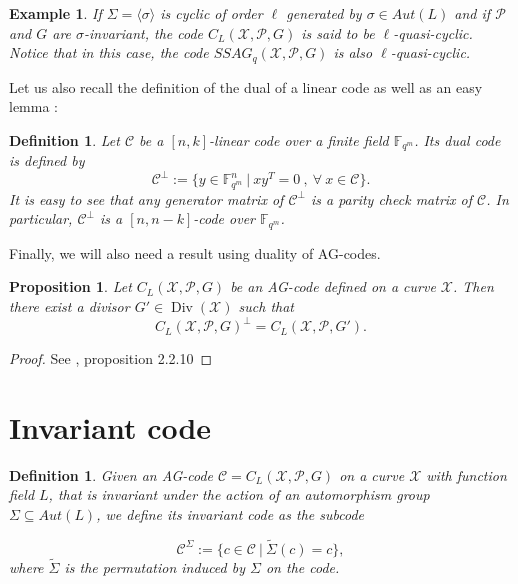 \documentclass[10pt]{article}
\newtheorem{def1}[thm]{Definition}
\newtheorem{expl}[thm]{Example}
\newtheorem{prop1}[thm]{Proposition}
\newcommand{\s}{\vspace{0.3cm}}
\newcommand{\fqm}{\mathbb{F}_{q^m}}
\newcommand{\su}{\subseteq}
\newcommand{\X}{\mathcal{X}}
\newcommand{\PR}{\mathcal{P}}
\newcommand{\Div}{\operatorname{Div}}
\begin{document}
\s

\begin{expl} 
\rm If $\Sigma = \langle\sigma\rangle$ is cyclic of order $\ell$ generated by $\sigma \in Aut(L)$ and if $\PR$ and $G$ are $\sigma$-invariant, the code $C_L(\X,\PR,G)$ is said to be $\ell$-quasi-cyclic. Notice that in this case, the code $SSAG_q(\X,\PR,G)$ is also $\ell$-quasi-cyclic.
\end{expl}

\s

Let us also recall the definition of the dual of a linear code as well as an easy lemma :

\s

\begin{def1}
Let $\mathcal{C}$ be a $[n,k]$-linear code over a finite field $\fqm$. Its dual code is defined by 
\[\mathcal{C}^{\perp} := \{ y \in \fqm^n \ | \ xy^T = 0 \ , \ \forall \ x \in \mathcal{C}\}.\]
It is easy to see that any generator matrix of $\mathcal{C}^{\perp}$ is a parity check matrix of $\mathcal{C}$. In particular, $\mathcal{C}^{\perp}$ is a $[n,n-k]$-code over $\fqm$.
\end{def1}

\s

Finally, we will also need a result using duality of AG-codes.

\s

\begin{prop1} \label{dual}
Let $C_L(\X,\PR,G)$ be an AG-code defined on a curve $\X$. Then there exist a divisor $G' \in \Div(\X)$ such that 
\[C_L(\X,\PR,G)^{\perp} = C_L(\X,\PR,G').\]
\end{prop1}

\s

\begin{proof}
See \cite{Sti}, proposition 2.2.10
\end{proof}

\section{Invariant code}

\s

\begin{def1} Given an AG-code $\mathcal{C} = C_L(\X,\PR,G)$ on a curve $\X$ with function field $L$, that is invariant under the action of an automorphism group $\Sigma \su Aut(L)$, we define its invariant code as the subcode 

\[\mathcal{C}^{\Sigma} := \{c \in \mathcal{C} \ | \ \tilde{\Sigma}(c)=c\},\]
where $\tilde{\Sigma}$ is the permutation induced by $\Sigma$ on the code.
\end{def1}
\s
\end{document}
